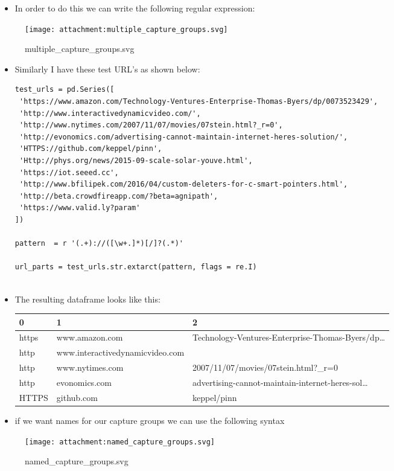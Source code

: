 \documentclass[11pt]{article}
\providecommand{\tightlist}{%
      \setlength{\itemsep}{0pt}\setlength{\parskip}{0pt}}
\begin{document}
\begin{itemize}
\tightlist
\item
  In order to do this we can write the following regular expression:
\end{itemize}

\begin{figure}
\centering
\texttt{[image: attachment:multiple\_capture\_groups.svg]}
\caption{multiple\_capture\_groups.svg}
\end{figure}

\begin{itemize}
\item
  Similarly I have these test URL's as shown below:

\begin{verbatim}
test_urls = pd.Series([
 'https://www.amazon.com/Technology-Ventures-Enterprise-Thomas-Byers/dp/0073523429',
 'http://www.interactivedynamicvideo.com/',
 'http://www.nytimes.com/2007/11/07/movies/07stein.html?_r=0',
 'http://evonomics.com/advertising-cannot-maintain-internet-heres-solution/',
 'HTTPS://github.com/keppel/pinn',
 'Http://phys.org/news/2015-09-scale-solar-youve.html',
 'https://iot.seeed.cc',
 'http://www.bfilipek.com/2016/04/custom-deleters-for-c-smart-pointers.html',
 'http://beta.crowdfireapp.com/?beta=agnipath',
 'https://www.valid.ly?param'
])

pattern  = r '(.+)://([\w+.]*)[/]?(.*)'

url_parts = test_urls.str.extarct(pattern, flags = re.I)


\end{verbatim}
\item
  The resulting dataframe looks like this:

  \begin{longtable}[]{@{}lll@{}}
  \toprule
  0 & 1 & 2\tabularnewline
  \midrule
  \endhead
  https & www.amazon.com &
  Technology-Ventures-Enterprise-Thomas-Byers/dp\ldots{}\tabularnewline
  http & www.interactivedynamicvideo.com &\tabularnewline
  http & www.nytimes.com &
  2007/11/07/movies/07stein.html?\_r=0\tabularnewline
  http & evonomics.com &
  advertising-cannot-maintain-internet-heres-sol\ldots{}\tabularnewline
  HTTPS & github.com & keppel/pinn\tabularnewline
  \bottomrule
  \end{longtable}
\item
  if we want names for our capture groups we can use the following
  syntax
\end{itemize}

\begin{figure}
\centering
\texttt{[image: attachment:named\_capture\_groups.svg]}
\caption{named\_capture\_groups.svg}
\end{figure}
\end{document}
